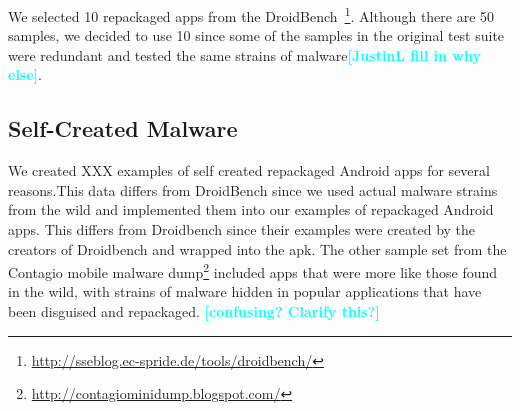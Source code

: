 \documentclass{sig-alternate}
\newcommand{\todo}[1]{\textcolor{cyan}{\textbf{[#1]}}}
\begin{document}
We selected 10 repackaged apps from the DroidBench~\footnote{\url{http://sseblog.ec-spride.de/tools/droidbench/}}. Although there are 50 samples, we decided to use 10 since some of the samples in the original test suite were redundant and tested the same strains of malware\todo{JustinL fill in why else}.







\subsection{Self-Created Malware}



We created XXX examples of self created repackaged Android apps for several reasons.This data differs from DroidBench since we used actual malware strains from the wild and implemented them into our examples of repackaged Android apps. This differs from Droidbench since their examples were created by the creators of Droidbench and wrapped into the apk. The other sample set from the Contagio mobile malware dump\footnote{\url{http://contagiominidump.blogspot.com/}} included apps that were more like those found in the wild, with strains of malware hidden in popular applications that have been disguised and repackaged. \todo{confusing? Clarify this?}
\end{document}
